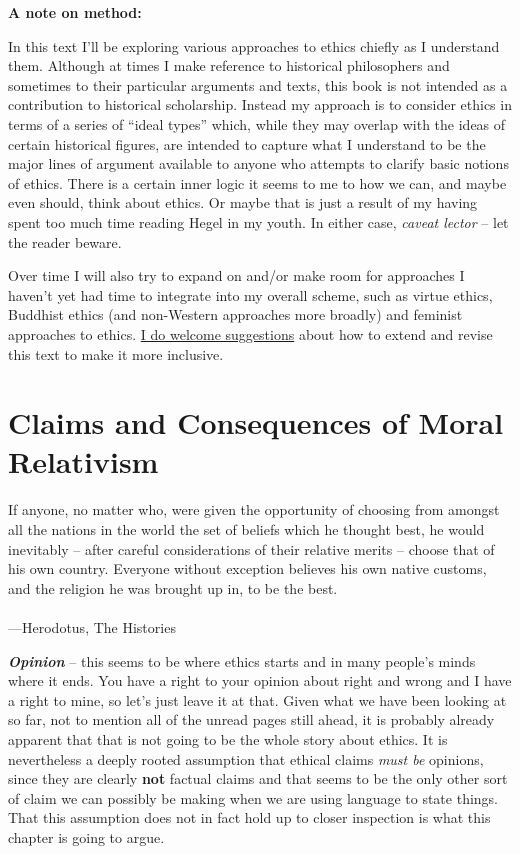 \documentclass[
  12pt, openany]{book}
\makeatletter
\newenvironment{kframe}{%
\medskip{}
\setlength{\fboxsep}{.8em}
 \def\at@end@of@kframe{}%
 \ifinner\ifhmode%
  \def\at@end@of@kframe{\end{minipage}}%
  \begin{minipage}{\columnwidth}%
 \fi\fi%
 \def\FrameCommand##1{\hskip\@totalleftmargin \hskip-\fboxsep
 \colorbox{shadecolor}{##1}\hskip-\fboxsep
     \hskip-\linewidth \hskip-\@totalleftmargin \hskip\columnwidth}%
 \MakeFramed {\advance\hsize-\width
   \@totalleftmargin\z@ \linewidth\hsize
   \@setminipage}}%
 {\par\unskip\endMakeFramed%
 \at@end@of@kframe}
\newenvironment{rmdblock}[1]
  {
  \begin{itemize}
  \renewcommand{\labelitemi}{
    \raisebox{-.7\height}[0pt][0pt]{
      {\setkeys{Gin}{width=3em,keepaspectratio}\texttt{[image: img/\#1]}}
    }
  }
  \setlength{\fboxsep}{1em}
  \begin{kframe}
  \item
  }
  {
  \end{kframe}
  \end{itemize}
  }
\newenvironment{note}
  {\begin{rmdblock}{note}}
  {\end{rmdblock}}
\newenvironment{epigraph}%
{
\begin{flushright}
\begin{minipage}{30em}
\begin{flushright}
\itshape
}%
{
\end{flushright}
\end{minipage}
\end{flushright}
\vspace{1em}
}
\theoremstyle{definition}
\theoremstyle{definition}
\theoremstyle{definition}
\theoremstyle{definition}
\theoremstyle{remark}
\makeatother
\begin{document}
\begin{note}
\textbf{A note on method:}

In this text I'll be exploring various approaches to ethics chiefly as I understand them. Although at times I make reference to historical philosophers and sometimes to their particular arguments and texts, this book is not intended as a contribution to historical scholarship. Instead my approach is to consider ethics in terms of a series of ``ideal types'' which, while they may overlap with the ideas of certain historical figures, are intended to capture what I understand to be the major lines of argument available to anyone who attempts to clarify basic notions of ethics. There is a certain inner logic it seems to me to how we can, and maybe even should, think about ethics. Or maybe that is just a result of my having spent too much time reading Hegel in my youth. In either case, \emph{caveat lector} -- let the reader beware.

Over time I will also try to expand on and/or make room for approaches I haven't yet had time to integrate into my overall scheme, such as virtue ethics, Buddhist ethics (and non-Western approaches more broadly) and feminist approaches to ethics. \protect\hyperlink{contribute}{I do welcome suggestions} about how to extend and revise this text to make it more inclusive.

\end{note}

\hypertarget{claims-and-consequences-of-moral-relativism}{%
\section{Claims and Consequences of Moral Relativism}\label{claims-and-consequences-of-moral-relativism}}

\begin{epigraph}
If anyone, no matter who, were given the opportunity of choosing from amongst all the nations in the world the set of beliefs which he thought best, he would inevitably -- after careful considerations of their relative merits -- choose that of his own country. Everyone without exception believes his own native customs, and the religion he was brought up in, to be the best.\\
~\\
---Herodotus, The Histories

\end{epigraph}

\textbf{\emph{Opinion}} -- this seems to be where ethics starts and in many people's minds where it ends. You have a right to your opinion about right and wrong and I have a right to mine, so let's just leave it at that. Given what we have been looking at so far, not to mention all of the unread pages still ahead, it is probably already apparent that that is not going to be the whole story about ethics. It is nevertheless a deeply rooted assumption that ethical claims \emph{must be} opinions, since they are clearly \textbf{not} factual claims and that seems to be the only other sort of claim we can possibly be making when we are using language to state things. That this assumption does not in fact hold up to closer inspection is what this chapter is going to argue.
\end{document}
